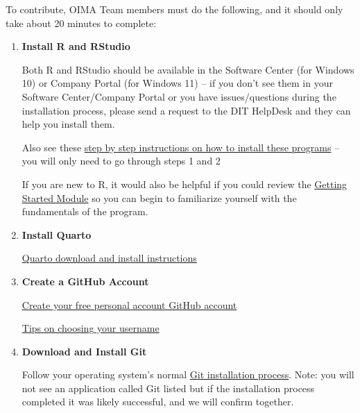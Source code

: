 \documentclass[
  letterpaper,
  DIV=11,
  numbers=noendperiod]{scrreprt}
\begin{document}
To contribute, OIMA Team members must do the following, and it should
only take about 20 minutes to complete:

\begin{enumerate}
\def\labelenumi{\arabic{enumi}.}
\item
  \textbf{Install R and RStudio}

  Both R and RStudio should be available in the Software Center (for
  Windows 10) or Company Portal (for Windows 11) -- if you don't see
  them in your Software Center/Company Portal or you have
  issues/questions during the installation process, please send a
  request to the DIT HelpDesk and they can help you install them.

  Also see these \href{https://www.r4wrds.com/intro/m_install_r}{step by
  step instructions on how to install these programs} -- you will only
  need to go through steps 1 and 2

  If you are new to R, it would also be helpful if you could review the
  \href{https://www.r4wrds.com/intro/m_getting_started.html}{Getting
  Started Module} so you can begin to familiarize yourself with the
  fundamentals of the program.
\item
  \textbf{Install Quarto}

  \href{https://quarto.org/docs/getting-started/installation.html}{Quarto
  download and install instructions}
\item
  \textbf{Create a GitHub Account}

  \href{https://docs.github.com/en/get-started/signing-up-for-github/signing-up-for-a-new-github-account}{Create
  your free personal account GitHub account}

  \href{https://happygitwithr.com/github-acct.html\#username-advice}{Tips
  on choosing your username}
\item
  \textbf{Download and Install Git}

  Follow your operating system's normal
  \href{https://git-scm.com/downloads}{Git installation process}. Note:
  you will not see an application called Git listed but if the
  installation process completed it was likely successful, and we will
  confirm together.
\end{enumerate}
\end{document}

